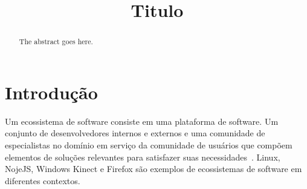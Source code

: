 \documentclass[conference]{IEEEtran}
\begin{document}
\title{Titulo}

\author{
\and
{}
\and
{}
}

\maketitle


\begin{abstract}
The abstract goes here.
\end{abstract}

\IEEEpeerreviewmaketitle



\section{Introdução}

Um ecossistema de software consiste em uma plataforma de software. Um conjunto de desenvolvedores internos e externos e uma comunidade de especialistas no domínio em serviço da comunidade de usuários que compõem elementos de soluções relevantes para satisfazer suas necessidades~\cite{Bosch201067}. Linux, NojeJS, Windows Kinect e Firefox são exemplos de ecossistemas de software em diferentes contextos. 
\end{document}
